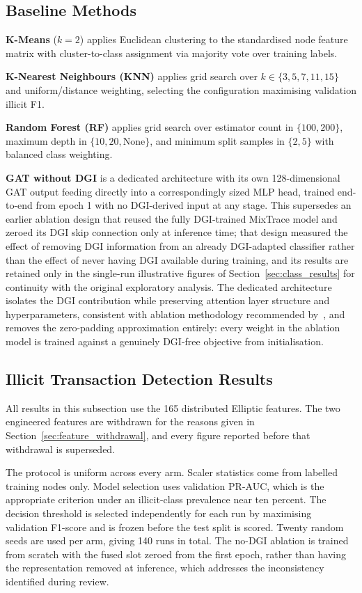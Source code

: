 \documentclass[12pt,a4paper]{article}
\begin{document}
\subsection{Baseline Methods}

\textbf{K-Means} ($k=2$) applies Euclidean clustering to
the standardised node feature matrix with cluster-to-class
assignment via majority vote over training labels.

\textbf{K-Nearest Neighbours (KNN)} applies grid search
over $k \in \{3,5,7,11,15\}$ and uniform/distance
weighting, selecting the configuration maximising
validation illicit F1.

\textbf{Random Forest (RF)} applies grid search over
estimator count in $\{100,200\}$, maximum depth in
$\{10,20,\text{None}\}$, and minimum split samples in
$\{2,5\}$ with balanced class weighting.

\textbf{GAT without DGI} is a dedicated architecture with
its own 128-dimensional GAT output feeding directly into a
correspondingly sized MLP head, trained end-to-end from
epoch 1 with no DGI-derived input at any stage. This
supersedes an earlier ablation design that reused the
fully DGI-trained MixTrace model and zeroed its DGI skip
connection only at inference time; that design measured
the effect of removing DGI information from an already
DGI-adapted classifier rather than the effect of never
having DGI available during training, and its results are
retained only in the single-run illustrative figures of
Section~\ref{sec:class_results} for continuity with the
original exploratory analysis. The dedicated architecture
isolates the DGI contribution while preserving attention
layer structure and hyperparameters, consistent with
ablation methodology recommended by~\citet{motie2024}, and
removes the zero-padding approximation entirely: every
weight in the ablation model is trained against a genuinely
DGI-free objective from initialisation.

\subsection{Illicit Transaction Detection Results}
\label{sec:detection_results}
\label{sec:class_results}

All results in this subsection use the 165 distributed Elliptic
features. The two engineered features are withdrawn for the
reasons given in Section~\ref{sec:feature_withdrawal}, and every
figure reported before that withdrawal is superseded.

The protocol is uniform across every arm. Scaler statistics come
from labelled training nodes only. Model selection uses
validation PR-AUC, which is the appropriate criterion under an
illicit-class prevalence near ten percent. The decision threshold
is selected independently for each run by maximising validation
F1-score and is frozen before the test split is scored. Twenty
random seeds are used per arm, giving 140 runs in total. The
no-DGI ablation is trained from scratch with the fused slot
zeroed from the first epoch, rather than having the
representation removed at inference, which addresses the
inconsistency identified during review.
\end{document}
